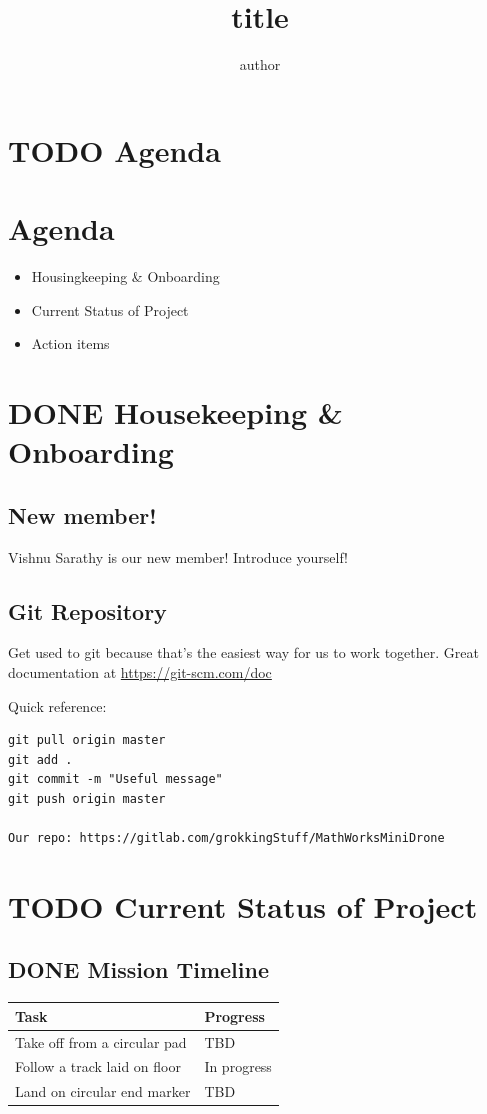 \documentclass[unrestricted]{meetingnotesminutes}
\title{ {{{title}}} }
\author{ {{{author}}} }
\date{}
\title{}
\begin{document}
\frontmatter

\section{{\bfseries\sffamily TODO} Agenda}
\label{sec:org41d2a2b}

\section*{Agenda}
\begin{itemize}
  \item Housingkeeping \& Onboarding
  \item Current Status of Project
  \item Action items
\end{itemize}

\tasklist

\section{{\bfseries\sffamily DONE} Housekeeping \& Onboarding}
\label{sec:org7baa450}
\subsection{New member!}
\label{sec:org7146243}
Vishnu Sarathy is our new member! Introduce yourself!

\subsection{Git Repository}
\label{sec:org66f7293}
Get used to git because that's the easiest way for us to work together.
Great documentation at \url{https://git-scm.com/doc}

Quick reference:
\begin{verbatim}
git pull origin master
git add .
git commit -m "Useful message"
git push origin master

Our repo: https://gitlab.com/grokkingStuff/MathWorksMiniDrone
\end{verbatim}

\section{{\bfseries\sffamily TODO} Current Status of Project}
\label{sec:org3cd4967}
\subsection{{\bfseries\sffamily DONE} Mission Timeline}
\label{sec:org8ac86e4}
\begin{center}
\begin{tabular}{ll}
Task & Progress\\
\hline
Take off from a circular pad & TBD\\
Follow a track laid on floor & In progress\\
Land on circular end marker & TBD\\
\end{tabular}
\end{center}
\end{document}
